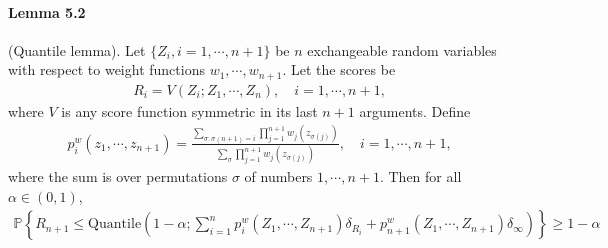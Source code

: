 \documentclass{article}
\numberwithin{equation}{section}
\begin{document}
\paragraph{Lemma 5.2\label{Lemma 5.2}} (Quantile lemma). Let $\{Z_i,i=1,\cdots,n+1\}$ be $n$ exchangeable random variables with respect to weight functions $w_1,\cdots,w_{n+1}.$ Let the scores be
\begin{align*}
	R_i = V(Z_i;Z_1,\cdots,Z_n),\quad i=1,\cdots,n+1,\tag{5.7}
\end{align*}
where $V$ is any score function symmetric in its last $n+1$ arguments. Define
\begin{align*}
	p^w_i(z_1,\cdots,z_{n+1}) = \frac{\sum_{\sigma:\sigma(n+1)=i}\prod_{j=1}^{n+1} w_j(z_{\sigma(j)})}{\sum_\sigma\prod_{j=1}^{n+1}w_j(z_{\sigma(j)})},\quad i=1,\cdots,n+1,\tag{5.8}\label{5.8}
\end{align*}
where the sum is over permutations $\sigma$ of numbers $1,\cdots,n+1.$ Then for all $\alpha\in(0,1)$,
\begin{align*}
	\mathbb{P}\left\{R_{n+1}\leq\mathrm{Quantile}\left(1-\alpha;\sum_{i=1}^np_i^w(Z_1,\cdots,Z_{n+1})\delta_{R_i} + p_{n+1}^w(Z_1,\cdots,Z_{n+1})\delta_\infty\right)\right\}\geq 1-\alpha\tag{5.9}\label{5.9}
\end{align*}
\end{document}
